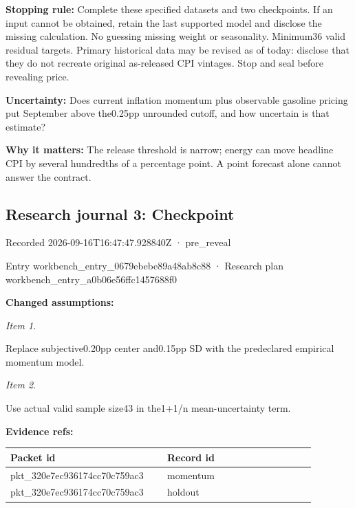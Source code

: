 \documentclass[11pt]{article}
\begin{document}
\par\noindent\textbf{Stopping rule:} Complete these specified datasets and two checkpoints. If an input cannot be obtained, retain the last supported model and disclose the missing calculation. No guessing missing weight or seasonality. Minimum36 valid residual targets. Primary historical data may be revised as of today: disclose that they do not recreate original as-released CPI vintages. Stop and seal before revealing price.

\par\noindent\textbf{Uncertainty:} Does current inflation momentum plus observable gasoline pricing put September above the0.25pp unrounded cutoff, and how uncertain is that estimate?

\par\noindent\textbf{Why it matters:} The release threshold is narrow; energy can move headline CPI by several hundredths of a percentage point. A point forecast alone cannot answer the contract.

\subsection*{\textcolor{epdarkgreen}{Research journal 3: Checkpoint}}
Recorded 2026-09-16T16:47:47.928840Z · pre\_reveal


Entry workbench\_en\hspace{0pt}try\_0679ebeb\hspace{0pt}e89a48ab8c88 · Research plan workbench\_en\hspace{0pt}try\_a0b06e56\hspace{0pt}ffc1457688f0


\par\noindent\textbf{Changed assumptions:} \par \par\noindent\textit{Item 1.}\par Replace subjective0.20pp center and0.15pp SD with the predeclared empirical momentum model.

\par\noindent\textit{Item 2.}\par Use actual valid sample size43 in the1+1/n mean-uncertainty term.

\par\noindent\textbf{Evidence refs:} \par \begin{longtable}{>{\raggedright\arraybackslash}p{0.440\linewidth}>{\raggedright\arraybackslash}p{0.440\linewidth}}
Packet id & Record id \\ \hline\endhead
pkt\_320e7ec936174cc70c759ac3 & momentum \\
pkt\_320e7ec936174cc70c759ac3 & holdout \\
\end{longtable}
\end{document}
